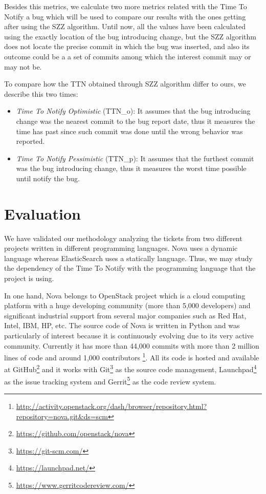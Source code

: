 \documentclass[10pt, conference]{IEEEtran}
\begin{document}
Besides this metrics, we calculate two more metrics related with the Time To Notify a bug which will be used to compare our results with the ones getting after using the SZZ algorithm. Until now, all the values have been calculated using the exactly location of the bug introducing change, but the SZZ algorithm does not locate the precise commit in which the bug was inserted, and also its outcome could be a a set of commits among which the interest commit may or may not be.

To compare how the TTN obtained through SZZ algorithm differ to ours, we describe this two times:
\begin{itemize}
	\item \emph{Time To Notify Optimistic} (TTN\_o): It assumes that the bug introducing change was the nearest commit to the bug report date, thus it measures the time has past since such commit was done until the wrong behavior was reported.
	\item \emph{Time To Notify Pessimistic} (TTN\_p): It assumes that the furthest commit was the bug introducing change, thus it measures the worst time possible until notify the bug.
\end{itemize}

\section{Evaluation}
\label{sec:evaluation}
We have validated our methodology analyzing the tickets from two different projects written in different programming languages. Nova uses a dynamic language whereas ElasticSearch uses a statically language. Thus, we may study the dependency of the Time To Notify with the programming language that the project is using.

In one hand, Nova belongs to OpenStack project which is a cloud computing platform with a huge developing community (more than 5,000 developers) and significant industrial support from several major companies such as Red Hat, Intel, IBM, HP, etc. The source code of Nova is written in Python and was particularly of interest because it is continuously evolving due to its very active community. Currently it has more than 44,000 commits with more than 2 million lines of code and around 1,000 contributors \footnote{\url{http://activity.openstack.org/dash/browser/repository.html?repository=nova.git&ds=scm}}. All its code is hosted and available at GitHub\footnote{\url{https://github.com/openstack/nova}} and it works with Git\footnote{\url{https://git-scm.com/}} as the source code management, Launchpad\footnote{\url{https://launchpad.net/}} as the issue tracking system  and  Gerrit\footnote{\url{https://www.gerritcodereview.com/}} as the code review system.
\end{document}
